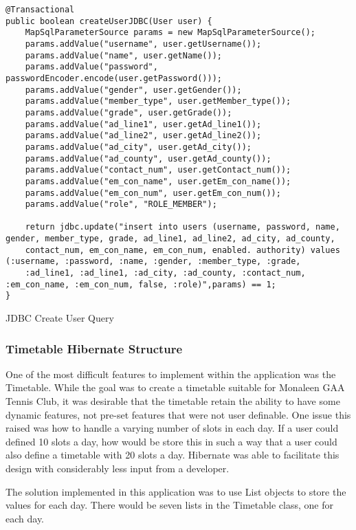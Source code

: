 \begin{table}[H]
\begin{lstlisting}
@Transactional
public boolean createUserJDBC(User user) {
	MapSqlParameterSource params = new MapSqlParameterSource();
	params.addValue("username", user.getUsername());
	params.addValue("name", user.getName());
	params.addValue("password", passwordEncoder.encode(user.getPassword()));
	params.addValue("gender", user.getGender());
	params.addValue("member_type", user.getMember_type());
	params.addValue("grade", user.getGrade());
	params.addValue("ad_line1", user.getAd_line1());
	params.addValue("ad_line2", user.getAd_line2());
	params.addValue("ad_city", user.getAd_city());
	params.addValue("ad_county", user.getAd_county());
	params.addValue("contact_num", user.getContact_num());
	params.addValue("em_con_name", user.getEm_con_name());
	params.addValue("em_con_num", user.getEm_con_num());
	params.addValue("role", "ROLE_MEMBER");

	return jdbc.update("insert into users (username, password, name, gender, member_type, grade, ad_line1, ad_line2, ad_city, ad_county, 
	contact_num, em_con_name, em_con_num, enabled. authority) values (:username, :password, :name, :gender, :member_type, :grade, 
	:ad_line1, :ad_line1, :ad_city, :ad_county, :contact_num, :em_con_name, :em_con_num, false, :role)",params) == 1;
}
\end{lstlisting}
\caption{JDBC Create User Query }
\end{table}

\subsubsection{Timetable Hibernate Structure}

One of the most difficult features to implement within the application was the Timetable. While the goal was to create a timetable suitable for Monaleen GAA Tennis Club, it was desirable that the timetable retain the ability to have some dynamic features, not pre-set features that were not user definable. One issue this raised was how to handle a varying number of slots in each day. If a user could defined 10 slots a day, how would be store this in such a way that a user could also define a timetable with 20 slots a day. Hibernate was able to facilitate this design with considerably less input from a developer.

The solution implemented in this application was to use List objects to store the values for each day. There would be seven lists in the Timetable class, one for each day.

